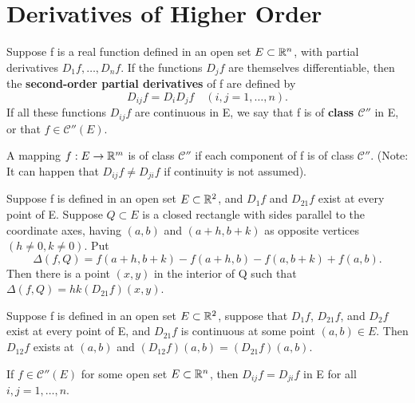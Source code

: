 \section{Derivatives of Higher Order}

\begin{definition}
  \label{def:chap9:higher_partials_C2}
  Suppose f is a real function defined in an open set $E \subset
  \mathbb{R}^n$, with partial derivatives $D_1 f, \dots, D_n f$. If the
  functions $D_j f$ are themselves differentiable, then the
  \textbf{second-order partial derivatives} of f are defined by
  \[
    D_{ij}f = D_i D_j f \quad (i, j = 1, \dots, n).
  \]
  If all these functions $D_{ij}f$ are continuous in E, we say that f
  is of \textbf{class $\mathcal{C}''$} in E, or that $f \in \mathcal{C}''(E)$.

  A mapping $f: E \to \mathbb{R}^m$ is of class $\mathcal{C}''$ if each
  component of f is of class $\mathcal{C}''$.
  (Note: It can happen that $D_{ij}f \ne D_{ji}f$ if continuity is not assumed).
\end{definition}


\begin{theorem}
  \label{thm:chap9:mvt_mixed_partials}
  Suppose f is defined in an open set $E \subset \mathbb{R}^2$, and $D_1 f$
  and $D_{21}f$ exist at every point of E. Suppose $Q \subset E$ is a
  closed rectangle with sides parallel to the coordinate axes, having
  $(\textit{a}, \textit{b})$ and $(a+h, b+k)$ as opposite vertices
  $(h \ne 0, k \ne 0)$. Put
  \[
    \Delta(f, Q) = f(a+h, b+k) - f(a+h, b) - f(a, b+k) + f(a, b).
  \]
  Then there is a point $(x, y)$ in the interior of Q such that
  $\Delta(f, Q) = hk (D_{21}f)(x, y)$.
\end{theorem}

\begin{theorem}
  \label{thm:chap9:equality_mixed_partials}
  Suppose f is defined in an open set $E \subset \mathbb{R}^2$, suppose that
  $D_1 f$, $D_{21}f$, and $D_2 f$ exist at every point of E, and
  $D_{21}f$ is continuous at some point $(a, b) \in E$. Then
  $D_{12}f$ exists at $(a, b)$ and $(D_{12}f)(a, b) = (D_{21}f)(a, b)$.
\end{theorem}

\begin{corollary}
  \label{cor:chap9:C2_implies_mixed_partials_equal}
  If $f \in \mathcal{C}''(E)$ for some open set $E \subset \mathbb{R}^n$,
  then $D_{ij}f = D_{ji}f$ in E for all $i, j = 1, \dots, n$.
\end{corollary}

